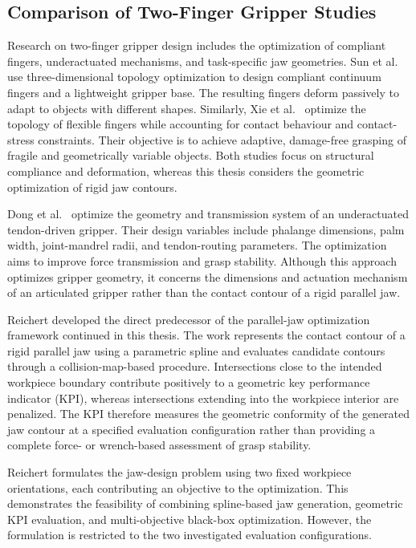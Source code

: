 \subsection{Comparison of Two-Finger Gripper Studies}

Research on two-finger gripper design includes the optimization of compliant fingers, underactuated mechanisms, and task-specific jaw geometries. Sun
et al.\ \cite{Sun2022LARG} use three-dimensional topology optimization to design compliant continuum fingers and a lightweight gripper base. The
resulting fingers deform passively to adapt to objects with different shapes. Similarly, Xie et al.\ \cite{Xie2024Design} optimize the topology of
flexible fingers while accounting for contact behaviour and contact-stress constraints. Their objective is to achieve adaptive, damage-free grasping
of fragile and geometrically variable objects. Both studies focus on structural compliance and deformation, whereas this thesis considers the
geometric optimization of rigid jaw contours.

Dong et al.\ \cite{Dong2018Geometric} optimize the geometry and transmission system of an underactuated tendon-driven gripper. Their design variables
include phalange dimensions, palm width, joint-mandrel radii, and tendon-routing parameters. The optimization aims to improve force transmission and
grasp stability. Although this approach optimizes gripper geometry, it concerns the dimensions and actuation mechanism of an articulated gripper
rather than the contact contour of a rigid parallel jaw.

Reichert \cite{reichert2024greiferoptimierung} developed the direct predecessor of the parallel-jaw optimization framework continued in this thesis. The work
represents the contact contour of a rigid parallel jaw using a parametric spline and evaluates candidate contours through a collision-map-based
procedure. Intersections close to the intended workpiece boundary contribute positively to a geometric key performance indicator (KPI), whereas
intersections extending into the workpiece interior are penalized. The KPI therefore measures the geometric conformity of the generated jaw contour
at a specified evaluation configuration rather than providing a complete force- or wrench-based assessment of grasp stability.

Reichert formulates the jaw-design problem using two fixed workpiece orientations, each contributing an objective to the optimization. This
demonstrates the feasibility of combining spline-based jaw generation, geometric KPI evaluation, and multi-objective black-box optimization. However,
the formulation is restricted to the two investigated evaluation configurations.

